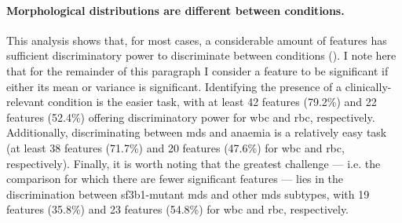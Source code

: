 \paragraph{Morphological distributions are different between conditions.} This analysis shows that, for most cases, a considerable amount of features has sufficient discriminatory power to discriminate between conditions (). I note here that for the remainder of this paragraph I consider a feature to be significant if either its mean or variance is significant. Identifying the presence of a clinically-relevant condition is the easier task, with at least 42 features (79.2\%) and 22 features (52.4\%) offering discriminatory power for \ac{wbc} and \ac{rbc}, respectively. Additionally, discriminating between \ac{mds} and anaemia is a relatively easy task (at least 38 features (71.7\%) and 20 features (47.6\%) for \ac{wbc} and \ac{rbc}, respectively). Finally, it is worth noting that the greatest challenge --- i.e. the comparison for which there are fewer significant features --- lies in the discrimination between \ac{sf3b1}-mutant \ac{mds} and other \ac{mds} subtypes, with 19 features (35.8\%) and 23 features (54.8\%) for \ac{wbc} and \ac{rbc}, respectively. 

\begin{figure}[!ht]
    \label{fig:dunn-test-heatmap}
\end{figure}

